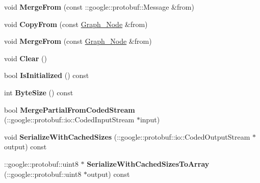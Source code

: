 \begin{DoxyCompactItemize}
\item 
\hypertarget{classgraph_1_1Graph__Node_a4c182ee38bc9ad649a9ae67f9ba5ae18}{
void {\bfseries MergeFrom} (const ::google::protobuf::Message \&from)}
\label{classgraph_1_1Graph__Node_a4c182ee38bc9ad649a9ae67f9ba5ae18}

\item 
\hypertarget{classgraph_1_1Graph__Node_ab2ba680d4220f5c206b77aa8dafd5816}{
void {\bfseries CopyFrom} (const \hyperlink{classgraph_1_1Graph__Node}{Graph\_\-Node} \&from)}
\label{classgraph_1_1Graph__Node_ab2ba680d4220f5c206b77aa8dafd5816}

\item 
\hypertarget{classgraph_1_1Graph__Node_a979ddc18e4e1238cf396311c6622ef43}{
void {\bfseries MergeFrom} (const \hyperlink{classgraph_1_1Graph__Node}{Graph\_\-Node} \&from)}
\label{classgraph_1_1Graph__Node_a979ddc18e4e1238cf396311c6622ef43}

\item 
\hypertarget{classgraph_1_1Graph__Node_a4bddb506c7141091ad3989769a535604}{
void {\bfseries Clear} ()}
\label{classgraph_1_1Graph__Node_a4bddb506c7141091ad3989769a535604}

\item 
\hypertarget{classgraph_1_1Graph__Node_a60da720d929b8e8d5aefd410466c3871}{
bool {\bfseries IsInitialized} () const }
\label{classgraph_1_1Graph__Node_a60da720d929b8e8d5aefd410466c3871}

\item 
\hypertarget{classgraph_1_1Graph__Node_ab25a1fde48166c7639063b5750b9887b}{
int {\bfseries ByteSize} () const }
\label{classgraph_1_1Graph__Node_ab25a1fde48166c7639063b5750b9887b}

\item 
\hypertarget{classgraph_1_1Graph__Node_a3d4ce335c0bc53aa858c0e7a87a257e7}{
bool {\bfseries MergePartialFromCodedStream} (::google::protobuf::io::CodedInputStream $\ast$input)}
\label{classgraph_1_1Graph__Node_a3d4ce335c0bc53aa858c0e7a87a257e7}

\item 
\hypertarget{classgraph_1_1Graph__Node_ac36ab307cedb19991696faea055dc7e1}{
void {\bfseries SerializeWithCachedSizes} (::google::protobuf::io::CodedOutputStream $\ast$output) const }
\label{classgraph_1_1Graph__Node_ac36ab307cedb19991696faea055dc7e1}

\item 
\hypertarget{classgraph_1_1Graph__Node_ab38db8ff30a7ec5d376f07cb5e7a329a}{
::google::protobuf::uint8 $\ast$ {\bfseries SerializeWithCachedSizesToArray} (::google::protobuf::uint8 $\ast$output) const }
\label{classgraph_1_1Graph__Node_ab38db8ff30a7ec5d376f07cb5e7a329a}


\end{DoxyCompactItemize}
